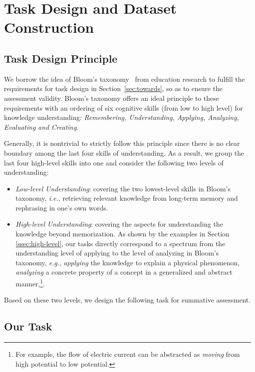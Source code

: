 \section{Task Design and Dataset Construction}









\subsection{Task Design Principle}
We borrow the idea of Bloom's taxonomy~\cite{krathwohl2002revision,armstrong2010bloom} from education research to fulfill the requirements for task design in Section~\ref{sec:towards}, so as to ensure the assessment validity.
Bloom's taxonomy offers an ideal principle to these requirements with an ordering of six cognitive skills (from low to high level) for knowledge understanding: \emph{Remembering, Understanding, Applying, Analyzing, Evaluating and Creating}.

Generally, it is nontrivial to strictly follow this principle since there is no clear boundary among the last four skills of understanding. 
As a result, we group the last four high-level skills into one and consider the following two levels of understanding:
\begin{itemize}[noitemsep,nolistsep,leftmargin=*]
    \item \emph{Low-level Understanding}: covering the two lowest-level skills in Bloom's taxonomy, \emph{i.e.}, retrieving relevant knowledge from long-term memory and rephrasing in one's own words.
    \item \emph{High-level Understanding}: covering the aspects for understanding the knowledge beyond memorization. As shown by the examples in Section \ref{ssec:high-level}, our tasks directly correspond to a spectrum from the understanding level of applying to the level of analyzing in Bloom's taxonomy, 
    \emph{e.g.}, \emph{applying} the knowledge to explain a physical phenomenon, \emph{analyzing} a concrete property of a concept in a generalized and abstract manner,\footnote{For example, the flow of electric current can be abstracted as \emph{moving} from high potential to low potential.}. %
\end{itemize}
Based on these two levels, we design the following \datasetname task for summative assessment. 



\subsection{Our \datasetname Task}

